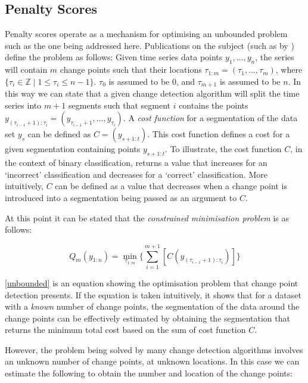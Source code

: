 \documentclass[../main.tex]{subfiles}
\begin{document}
\subsection{Penalty Scores}

Penalty scores operate as a mechanism for optimising an unbounded problem such as the one being addressed here. Publications on the subject (such as  by \citeauthor{Haynes2014} \cite{Haynes2014}) define the problem as follows: Given time series data points $y_1,\ldots,y_n$, the series will contain $m$ change points such that their locations $\tau_{1:m} = (\tau_1,\ldots,\tau_m)$, where $\{\tau_i \in \mathbb{Z} \mid 1 \leqslant \tau_i \leqslant n-1\}$. $\tau_0$ is assumed to be 0, and $\tau_{m+1}$ is assumed to be $n$. In this way we can state that a given change detection algorithm will split the time series into $m + 1$ segments such that segment $i$ contains the points $y_{(\tau_{i-1}+1):\tau_i} = (y_{\tau_{i-1} + 1},\dots,y_{\tau_i})$. A \emph{cost function} for a segmentation of the data set $y_s$ can be defined as $C = (y_{s+1:t})$. This cost function defines a cost for a given segmentation containing points $y_{s+1:t}$. To illustrate, the cost function $C$, in the context of binary classification, returns a value that increases for an `incorrect' classification and decreases for a `correct' classification. More intuitively, $C$ can be defined as a value that decreases when a change point is introduced into a segmentation being passed as an argument to $C$.

At this point it can be stated that the \emph{constrained minimisation problem} is as follows:

\begin{equation}
\label{unbounded}
    Q_m(y_{1:n}) = \min_{\tau_{1:m}} \Bigg\{ \sum^{m+1}_{i=1}[C(y_{(\tau_{i - 1} + 1):\tau_i})] \Bigg\}
\end{equation}

\autoref{unbounded} is an equation showing the optimisation problem that change point detection presents. If the equation is taken intuitively, it shows that for a dataset with a \emph{known} number of change points, the segmentation of the data around the change points can be effectively estimated by obtaining the segmentation that returns the minimum total cost based on the sum of cost function $C$.

However, the problem being solved by many change detection algorithms involves an unknown number of change points, at unknown locations. In this case we can estimate the following to obtain the number and location of the change points:
\end{document}
